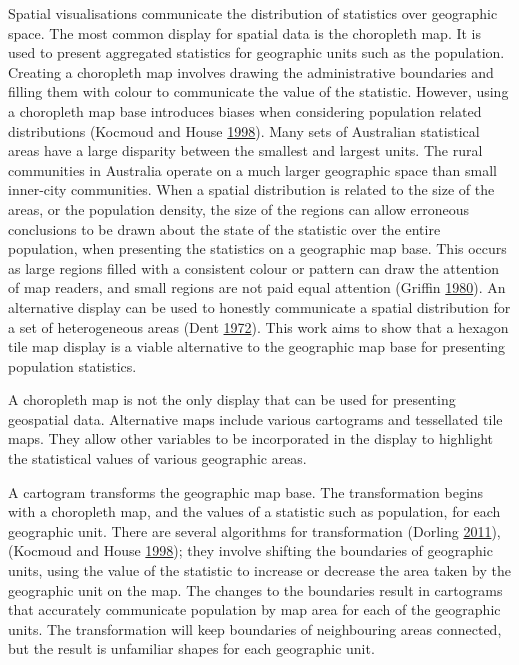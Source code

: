 \documentclass[conference,final,]{IEEEtran}
\begin{document}
Spatial visualisations communicate the distribution of statistics over geographic space. The most common display for spatial data is the choropleth map. It is used to present aggregated statistics for geographic units such as the population. Creating a choropleth map involves drawing the administrative boundaries and filling them with colour to communicate the value of the statistic. However, using a choropleth map base introduces biases when considering population related distributions (Kocmoud and House \protect\hyperlink{ref-CBATCC}{1998}).
Many sets of Australian statistical areas have a large disparity between the smallest and largest units.
The rural communities in Australia operate on a much larger geographic space than small inner-city communities. When a spatial distribution is related to the size of the areas, or the population density, the size of the regions can allow erroneous conclusions to be drawn about the state of the statistic over the entire population, when presenting the statistics on a geographic map base. This occurs as large regions filled with a consistent colour or pattern can draw the attention of map readers, and small regions are not paid equal attention (Griffin \protect\hyperlink{ref-CTTMB}{1980}). An alternative display can be used to honestly communicate a spatial distribution for a set of heterogeneous areas (Dent \protect\hyperlink{ref-NISCC}{1972}).
This work aims to show that a hexagon tile map display is a viable alternative to the geographic map base for presenting population statistics.

A choropleth map is not the only display that can be used for presenting geospatial data.
Alternative maps include various cartograms and tessellated tile maps. They allow other variables to be incorporated in the display to highlight the statistical values of various geographic areas.

A cartogram transforms the geographic map base. The transformation begins with a choropleth map, and the values of a statistic such as population, for each geographic unit. There are several algorithms for transformation (Dorling \protect\hyperlink{ref-ACTUC}{2011}), (Kocmoud and House \protect\hyperlink{ref-CBATCC}{1998}); they involve shifting the boundaries of geographic units, using the value of the statistic to increase or decrease the area taken by the geographic unit on the map.
The changes to the boundaries result in cartograms that accurately communicate population by map area for each of the geographic units. The transformation will keep boundaries of neighbouring areas connected, but the result is unfamiliar shapes for each geographic unit.
\end{document}
